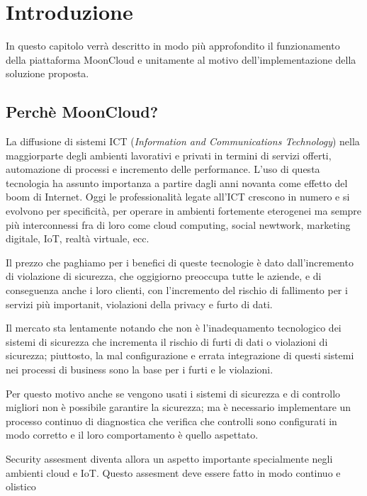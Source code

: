 \chapter{Introduzione}
In questo capitolo verrà descritto in modo più approfondito 
il funzionamento della piattaforma MoonCloud e unitamente al 
motivo dell'implementazione della soluzione proposta.

\section{Perchè MoonCloud?}
La diffusione di sistemi ICT (\textit{Information and Communications Technology})
nella maggiorparte degli ambienti lavorativi e privati in termini di servizi offerti,
automazione di processi e incremento delle performance. L'uso di questa tecnologia 
ha assunto importanza a partire dagli anni novanta come effetto del boom di Internet.
Oggi le professionalità legate all'ICT crescono in numero e si evolvono per 
specificità, per operare in ambienti fortemente eterogenei ma sempre più interconnessi 
fra di loro come cloud computing, social newtwork, marketing digitale, IoT, realtà virtuale,
ecc.

Il prezzo che paghiamo per i benefici di queste tecnologie è dato dall'incremento di 
violazione di sicurezza, che oggigiorno preoccupa tutte le aziende, e di conseguenza anche i 
loro clienti, con l'incremento del rischio di fallimento per i servizi più importanit, 
violazioni della privacy e furto di dati.

Il mercato sta lentamente notando che non è l'inadequamento tecnologico dei sistemi di sicurezza
che incrementa il rischio di furti di dati o violazioni di sicurezza; piuttosto, la mal configurazione
e errata integrazione di questi sistemi nei processi di business sono la base per 
i furti e le violazioni. \cite{cloud-Platform-for-ICT-Security-Governance}

Per questo motivo anche se vengono usati i sistemi di sicurezza e di controllo migliori non è possibile 
garantire la sicurezza; ma è necessario implementare un processo continuo di diagnostica che verifica che 
controlli sono configurati in modo corretto e il loro comportamento è quello aspettato.

Security assesment diventa allora un aspetto importante specialmente negli ambienti cloud e IoT. Questo 
assesment deve essere fatto in modo continuo e olistico